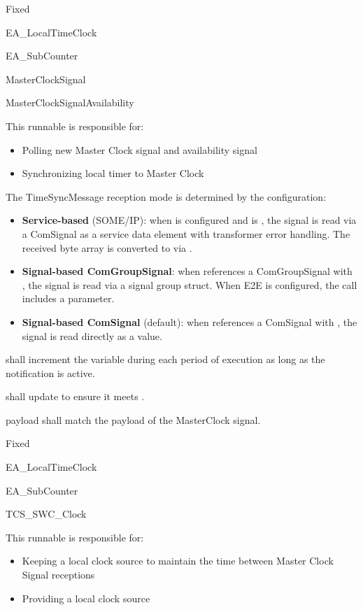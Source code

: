 {Fixed}
{EA_LocalTimeClock

EA_SubCounter
}
{MasterClockSignal

MasterClockSignalAvailability}
{}
{}
{}
{This runnable is responsible for:
\begin{itemize}
\item Polling new Master Clock signal and availability signal
\item Synchronizing local timer to Master Clock
\end{itemize}
The TimeSyncMessage reception mode is determined by the configuration:
\begin{itemize}
\item \textbf{Service-based} (SOME/IP): when  is configured and  is , the signal is read via a ComSignal as a service data element with transformer error handling. The received byte array is converted to  via .
\item \textbf{Signal-based ComGroupSignal}: when  references a ComGroupSignal with  , the signal is read via a signal group struct. When E2E is configured, the  call includes a  parameter.
\item \textbf{Signal-based ComSignal} (default): when  references a ComSignal with  , the signal is read directly as a  value.
\end{itemize}
}
{ }

{ shall increment the variable  during each period of execution as long as the  notification is active.}
{}

{ shall update  to ensure it meets .}
{}

{ payload shall match the payload of the MasterClock signal.}
{}

{Fixed}
{EA_LocalTimeClock

EA_SubCounter
}
{}
{TCS_SWC_Clock}
{}
{}
{This runnable is responsible for:
\begin{itemize}
\item Keeping  a local clock source to maintain the time between Master Clock Signal receptions
\item Providing a local clock source
\end{itemize}
}

